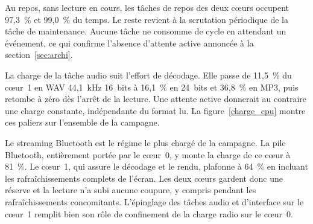 Au repos, sans lecture en cours, les tâches de repos des deux cœurs occupent 97,3~\% et 99,0~\% du temps. Le reste revient à la scrutation périodique de la tâche de maintenance. Aucune tâche ne consomme de cycle en attendant un événement, ce qui confirme l'absence d'attente active annoncée à la section~\ref{sec:archi}.

La charge de la tâche audio suit l'effort de décodage. Elle passe de 11,5~\% du cœur~1 en WAV 44,1~kHz 16~bits à 16,1~\% en 24~bits et 36,8~\% en MP3, puis retombe à zéro dès l'arrêt de la lecture. Une attente active donnerait au contraire une charge constante, indépendante du format lu. La figure~\ref{charge_cpu} montre ces paliers sur l'ensemble de la campagne.


Le streaming Bluetooth est le régime le plus chargé de la campagne. La pile Bluetooth, entièrement portée par le cœur~0, y monte la charge de ce cœur à 81~\%. Le cœur~1, qui assure le décodage et le rendu, plafonne à 64~\% en incluant les rafraîchissements complets de l'écran. Les deux cœurs gardent donc une réserve et la lecture n'a subi aucune coupure, y compris pendant les rafraîchissements concomitants. L'épinglage des tâches audio et d'interface sur le cœur~1 remplit bien son rôle de confinement de la charge radio sur le cœur~0.